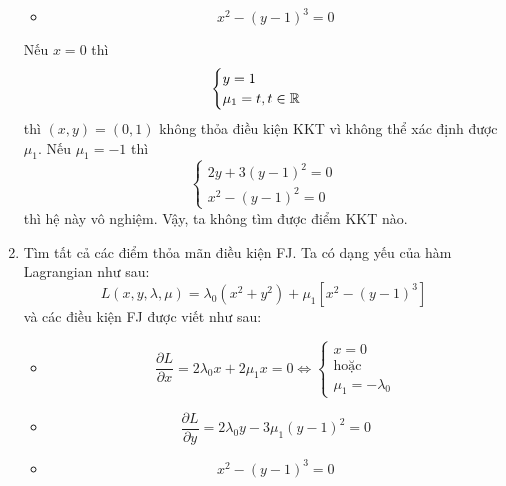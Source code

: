 \begin{solution}
\begin{enumerate}[label=(\alph*)]
\begin{itemize}
\begin{equation}
        \end{equation}
        \item \begin{equation}
            x^2 - (y - 1)^3 = 0
        \end{equation}
    \end{itemize}
    Nếu $x = 0$ thì 
    \begin{equation}
        \begin{cases}
            y = 1\\
            \mu_1 = t, t \in \mathbb{R}
        \end{cases}
    \end{equation} thì $(x, y) = (0,1)$ không thỏa điều kiện KKT vì không thể xác định được $\mu_1$.
    Nếu $\mu_1 = -1$ thì
    \begin{equation}
        \begin{cases}
            2y + 3(y-1)^2 = 0\\
            x^2 - (y-1)^2 = 0
        \end{cases}
    \end{equation}
    thì hệ này vô nghiệm.
    Vậy, ta không tìm được điểm KKT nào.
    \item Tìm tất cả các điểm thỏa mãn điều kiện FJ. Ta có dạng yếu của hàm Lagrangian như sau:
    \begin{equation}
        L(x, y, \lambda, \mu) = \lambda_0(x^2 + y^2) + \mu_1\left[x^2 - (y - 1)^3\right]
    \end{equation}
    và các điều kiện FJ được viết như sau:
    \begin{itemize}
        \item \begin{equation}
            \dfrac{\partial L}{\partial x} = 2\lambda_0x + 2\mu_1x = 0 \Leftrightarrow \begin{cases}
                x = 0\\ 
                \text{hoặc} \\
                \mu_1 = -\lambda_0
            \end{cases}
        \end{equation}
        \item \begin{equation}
            \dfrac{\partial L}{\partial y} = 2\lambda_0y - 3\mu_1(y-1)^2 = 0
        \end{equation}
        \item \begin{equation}
            x^2 - (y - 1)^3 = 0
        \end{equation}

\end{itemize}
\end{enumerate}
\end{solution}
